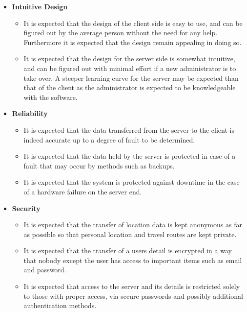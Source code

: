 \documentclass{article}
\begin{document}
			\begin{itemize}
				
				\item \textbf{Intuitive Design}
				\begin{itemize}
					\item It is expected that the design of the client side is easy to use, and can be figured out by the average person without the need for any help. Furthermore it is expected that the design remain appealing in doing so.
					\item It is expected that the design for the server side is somewhat intuitive, and can be figured out with minimal effort if a new administrator is to take over. A steeper learning curve for the server may be expected than that of the client as the administrator is expected to be knowledgeable with the software.
				\end{itemize}
				
			\end{itemize}
		
			\begin{itemize}
	
				\item \textbf{Reliability}
				\begin{itemize}
					\item It is expected that the data transferred from the server to the client is indeed accurate up to a degree of fault to be determined.
					\item It is expected that the data held by the server is protected in case of a fault that may occur by methods such as backups.
					\item It is expected that the system is protected against downtime in the case of a hardware failure on the server end.
				\end{itemize}	
	
			\end{itemize}
		
			\begin{itemize}
			
				\item \textbf{Security}
			
				\begin{itemize}
					\item It is expected that the transfer of location data is kept anonymous as far as possible so that personal location and travel routes are kept private.
					\item It is expected that the transfer of a users detail is encrypted in a way that nobody except the user has access to important items such as email and password.
					\item It is expected that access to the server and its details is restricted solely to those with proper access, via secure passwords and possibly additional authentication methods.
				\end{itemize}	
			
			\end{itemize}				
		
\end{document}
